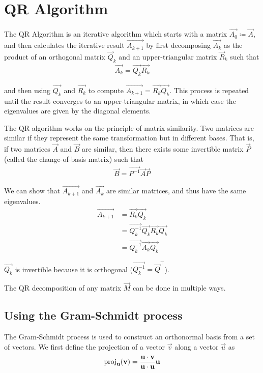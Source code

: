 \documentclass{article}
\begin{document}
\section{QR Algorithm}

The QR Algorithm is an iterative algorithm which starts with a matrix $\vec{A_0} \coloneqq \vec{A}$,
and then calculates the iterative result $\vec{A_{k+1}}$ by first decomposing $\vec{A_k}$ as the
product of an orthogonal matrix $\vec{Q}_k$ and an upper-triangular matrix $\vec{R}_k$ such that
\begin{align}
\vec{A_k} = \vec{Q_k}\vec{R_k}
\end{align}

and then using $\vec{Q_k}$ and $\vec{R_k}$ to compute $\vec{A_{k+1}} = \vec{R_k} \vec{Q_k}$.
This process is repeated until the result converges to an upper-triangular matrix, in which
case the eigenvalues are given by the diagonal elements.

The QR algorithm works on the principle of matrix similarity. Two matrices are
similar if they represent the same transformation but in different bases. That is,
if two matrices $\vec{A}$ and $\vec{B}$ are similar, then there exists some invertible
matrix $\vec{P}$ (called the change-of-basis matrix) such that
\begin{align}
\vec{B} = \vec{P^{-1}}\vec{A}\vec{P}
\end{align}

We can show that $\vec{A_{k+1}}$ and $\vec{A_k}$ are similar matrices, and thus have the 
same eigenvalues.
\begin{align}
    \vec{A_{k+1}} &= \vec{R_k}\vec{Q_k} \\
    &= \vec{Q_k^{-1}}\vec{Q_k}\vec{R_k}\vec{Q_k} \\
    &= \vec{Q_k^{-1}}\vec{A_k}\vec{Q_k}
\end{align}

$\vec{Q_k}$ is invertible because it is orthogonal ($\vec{Q_k^{-1}} = \vec{Q}^\top$).

The QR decomposition of any matrix $\vec{M}$ can be done in multiple ways.

\subsection{Using the Gram-Schmidt process}

The Gram-Schmidt process is used to construct an orthonormal basis from a set of
vectors. We first define the projection of a vector $\vec{v}$ along a vector $\vec{u}$
as 
\begin{align}
    \operatorname{proj}_{\mathbf{u}}(\mathbf{v}) = \frac{\mathbf{u} \cdot \mathbf{v}}{\mathbf{u} \cdot \mathbf{u}} \mathbf{u}
\end{align}
\end{document}

